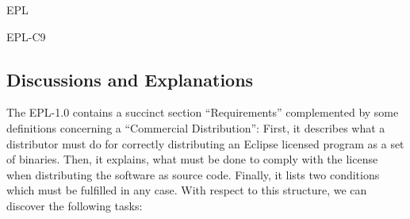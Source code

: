 \begin{license}{EPL}
\begin{lsuc}{EPL-C9}


  \begin{lsucrequires}
    \lsucmandatory{\keepLicensingElements\ \addWhenCompiling}
    \lsucmandatory{\describeModifications}
    \lsucmandatory{\markAllModifications}
    \lsucmandatory{\linkToRepo}
    \lsucmandatory{\organizeYourModifications}
    \lsucoptional{\addToYourCopyrightNotice}
  \end{lsucrequires}

  \begin{lsucprohibits}
    \lsucitem{\dontChangeCopyrightNotices}
    \lsucitem{\noPatentLitigation}
  \end{lsucprohibits}

\end{lsuc}

\subsection{Discussions and Explanations}
\label{EPLDiscussion}

The EPL-1.0 contains a succinct section \enquote{Requirements}
complemented by some definitions concerning a \enquote{Commercial
Distribution}: First, it describes what a distributor must do for
correctly distributing an Eclipse licensed program as a set of binaries. Then,
it explains, what must be done to comply with the license when distributing the
software as source code.  Finally, it lists two conditions which must be
fulfilled in any case.  
With respect to this structure, we can discover the following tasks:

\begin{itemize}


\end{itemize}
\end{license}
